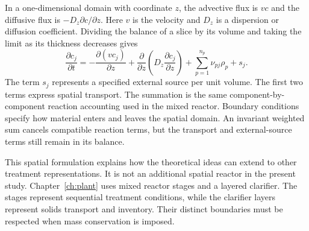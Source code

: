 In a one-dimensional domain with coordinate $z$, the advective flux is $v c$ and the diffusive flux is $-D_z\partial c/\partial z$. Here $v$ is the velocity and $D_z$ is a dispersion or diffusion coefficient. Dividing the balance of a slice by its volume and taking the limit as its thickness decreases gives
\begin{equation}
\frac{\partial c_j}{\partial t}
=-\frac{\partial(v c_j)}{\partial z}
+\frac{\partial}{\partial z}
\left(D_z\frac{\partial c_j}{\partial z}\right)
+\sum_{p=1}^{n_p}\nu_{pj}\rho_p+s_j.
\label{eq:teaching_spatial_balance}
\end{equation}
The term $s_j$ represents a specified external source per unit volume. The first two terms express spatial transport. The summation is the same component-by-component reaction accounting used in the mixed reactor. Boundary conditions specify how material enters and leaves the spatial domain. An invariant weighted sum cancels compatible reaction terms, but the transport and external-source terms still remain in its balance.

This spatial formulation explains how the theoretical ideas can extend to other treatment representations. It is not an additional spatial reactor in the present study. Chapter~\ref{ch:plant} uses mixed reactor stages and a layered clarifier. The stages represent sequential treatment conditions, while the clarifier layers represent solids transport and inventory. Their distinct boundaries must be respected when mass conservation is imposed.
